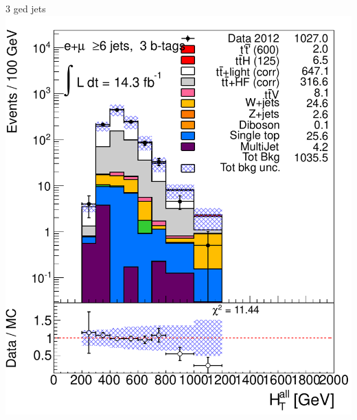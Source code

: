 \begin{frame}
\begin{minipage}{.45\textwidth}
 3 \btag ged jets\\
\includegraphics[width=.8\textwidth]{pics/htx_httails/HTAll_ELEMUON_6jetin3btagex_NOMINAL_logscale}

\end{minipage}

\end{frame}



